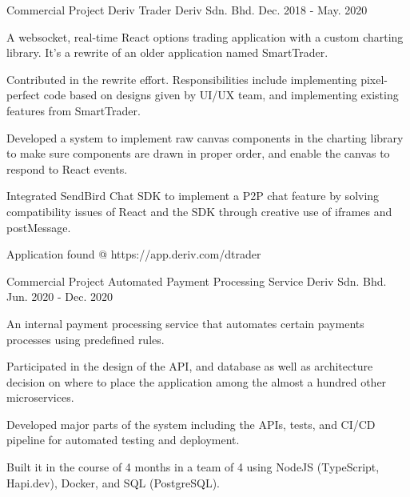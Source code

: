 

\begin{cventries}

  \cventry
    {Commercial Project} %
    {Deriv Trader} %
    {Deriv Sdn. Bhd.} %
    {Dec. 2018 - May. 2020} %
    {
      \begin{cvitems} %
        \item {A websocket, real-time React options trading application with a custom charting library. It's a rewrite of an older application named SmartTrader.}
        \item {Contributed in the rewrite effort. Responsibilities include implementing pixel-perfect code based on designs given by UI/UX team, and implementing existing features from SmartTrader.}
        \item {Developed a system to implement raw canvas components in the charting library to make sure components are drawn in proper order, and enable the canvas to respond to React events.}
        \item {Integrated SendBird Chat SDK to implement a P2P chat feature by solving compatibility issues of React and the SDK through creative use of iframes and postMessage. }
        \item {Application found @ https://app.deriv.com/dtrader}
      \end{cvitems}
    }

  \cventry
    {Commercial Project} %
    {Automated Payment Processing Service} %
    {Deriv Sdn. Bhd.} %
    {Jun. 2020 - Dec. 2020} %
    {
      \begin{cvitems} %
        \item {An internal payment processing service that automates certain payments processes using predefined rules.}
        \item {Participated in the design of the API, and database as well as architecture decision on where to place the application among the almost a hundred other microservices.}
        \item {Developed major parts of the system including the APIs, tests, and CI/CD pipeline for automated testing and deployment.}
        \item {Built it in the course of 4 months in a team of 4 using NodeJS (TypeScript, Hapi.dev), Docker, and SQL (PostgreSQL).}
      \end{cvitems}
    }

\end{cventries}